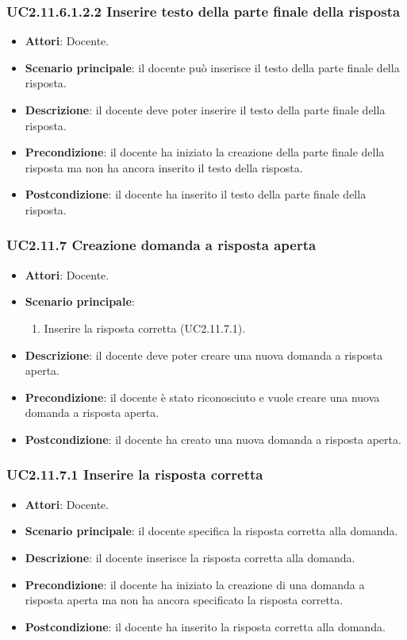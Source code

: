 \subsubsection{UC2.11.6.1.2.2 Inserire testo della parte finale della risposta}
\begin{itemize}
\item \textbf{Attori}: Docente.
\item \textbf{Scenario principale}: il docente può inserisce il testo della parte finale della risposta.
\item \textbf{Descrizione}: il docente deve poter inserire il testo della parte finale della risposta.
\item \textbf{Precondizione}: il docente ha iniziato la creazione della parte finale della risposta ma non ha ancora inserito il testo della risposta.
\item \textbf{Postcondizione}: il docente ha inserito il testo della parte finale della risposta.
\end{itemize}
\subsubsection{UC2.11.7 Creazione domanda a risposta aperta}
\begin{itemize}
\item \textbf{Attori}: Docente.
\item \textbf{Scenario principale}:
\begin{enumerate}
\item Inserire la risposta corretta (UC2.11.7.1).
\end{enumerate}
\item \textbf{Descrizione}: il docente deve poter creare una nuova domanda a risposta aperta.
\item \textbf{Precondizione}: il docente è stato riconosciuto e vuole creare una nuova domanda a risposta aperta.
\item \textbf{Postcondizione}: il docente ha creato una nuova domanda a risposta aperta.
\end{itemize}
\subsubsection{UC2.11.7.1 Inserire la risposta corretta}
\begin{itemize}
\item \textbf{Attori}: Docente.
\item \textbf{Scenario principale}: il docente specifica la risposta corretta alla domanda.
\item \textbf{Descrizione}: il docente inserisce la risposta corretta alla domanda.
\item \textbf{Precondizione}: il docente ha iniziato la creazione di una domanda a risposta aperta ma non ha ancora specificato la risposta corretta.
\item \textbf{Postcondizione}: il docente ha inserito la risposta corretta alla domanda.
\end{itemize}
